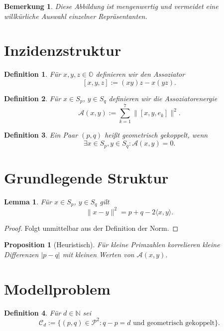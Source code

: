 \documentclass[11pt]{article}
\newtheorem{definition}{Definition}
\newtheorem{proposition}{Proposition}
\newtheorem{lemma}{Lemma}
\newtheorem{remark}{Bemerkung}
\begin{document}
	\begin{remark}
		Diese Abbildung ist mengenwertig und vermeidet eine willkürliche Auswahl einzelner Repräsentanten.
	\end{remark}
	
	\section{Inzidenzstruktur}
	
	\begin{definition}
		Für $x,y,z \in \mathbb{O}$ definieren wir den Assoziator
		\[
		[x,y,z] := (xy)z - x(yz).
		\]
	\end{definition}
	
	\begin{definition}
		Für $x\in S_p$, $y\in S_q$ definieren wir die Assoziatorenergie
		\[
		\mathcal{A}(x,y) := \sum_{k=1}^7 \|[x,y,e_k]\|^2.
		\]
	\end{definition}
	
	\begin{definition}
		Ein Paar $(p,q)$ heißt geometrisch gekoppelt, wenn
		\[
		\exists x\in S_p, y\in S_q: \mathcal{A}(x,y)=0.
		\]
	\end{definition}
	
	\section{Grundlegende Struktur}
	
	\begin{lemma}
		Für $x\in S_p$, $y\in S_q$ gilt
		\[
		\|x-y\|^2 = p + q - 2\langle x,y \rangle.
		\]
	\end{lemma}
	
	\begin{proof}
		Folgt unmittelbar aus der Definition der Norm.
	\end{proof}
	
	\begin{proposition}[Heuristisch]
		Für kleine Primzahlen korrelieren kleine Differenzen $|p-q|$ mit kleinen Werten von $\mathcal{A}(x,y)$.
	\end{proposition}
	
	\section{Modellproblem}
	
	\begin{definition}
		Für $d\in\mathbb{N}$ sei
		\[
		\mathcal{C}_d := \{(p,q)\in\mathcal{P}^2 : q-p=d \text{ und geometrisch gekoppelt}\}.
		\]
	\end{definition}
	
\end{document}

